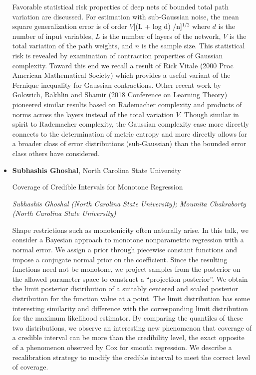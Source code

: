 \begin{itemize}
Favorable statistical risk properties of deep nets of bounded total path variation are discussed. For estimation with sub-Gaussian noise, the mean square generalization error is of order $V  $[(L + log d) /n]$^{1/2}$ where $d$ is the number of input variables, $L$ is the number of layers of the network, $V$ is the total variation of the path weights, and $n$ is the sample size. This statistical risk is revealed by examination of contraction properties of  Gaussian complexity. Toward this end we recall a result of Rick Vitale (2000 Proc American Mathematical Society) which provides a useful variant of the Fernique inequality for Gaussian contractions.  Other recent work by Golowich, Rakhlin and Shamir (2018 Conference on Learning Theory) pioneered similar results based on Rademacher complexity and products of norms across the layers instead of the total variation $V$. Though similar in spirit to Rademacher complexity, the Gaussian complexity case more directly connects to the determination of metric entropy and more directly allows for a broader class of error distributions (sub-Gaussian) than the bounded error class others have considered.

\item \textbf{Subhashis Ghoshal}, North Carolina State University

Coverage of Credible Intervals for Monotone Regression

\emph{\footnotesize Subhashis Ghoshal (North Carolina State University); Moumita Chakraborty (North Carolina State University)}

Shape restrictions such as monotonicity often naturally arise. In this talk, we consider a Bayesian approach to monotone nonparametric regression with a normal error. We assign a prior through piecewise constant functions and impose a conjugate normal prior on the coefficient. Since the resulting functions need not be monotone, we project samples from the posterior on the allowed parameter space to construct a “projection posterior”. We obtain the limit posterior distribution of a suitably centered and scaled posterior distribution for the function value at a point. The limit distribution has some interesting similarity and difference with the corresponding limit distribution for the maximum likelihood estimator. By comparing the quantiles of these two distributions, we observe an interesting new phenomenon that coverage of a credible interval can be more than the credibility level, the exact opposite of a phenomenon observed by Cox for smooth regression. We describe a recalibration strategy to modify the credible interval to meet the correct level of coverage.

\end{itemize}

